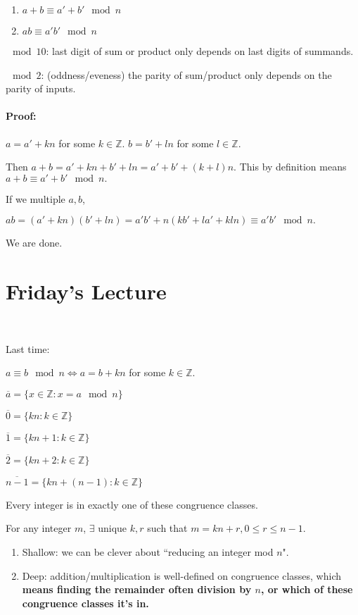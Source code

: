 \documentclass[a4paper, 11pt, twoside]{article}
\begin{document}
\begin{enumerate}
	\item $a+b\equiv a'+b' \mod n$
	\item $ab\equiv a'b' \mod n$
\end{enumerate}

$\mod 10$: last digit of sum or product only depends on last digits of summands.

$\mod 2$: (oddness/eveness) the parity of sum/product only depends on the parity of inputs.

\paragraph{Proof:} $a=a'+kn$ for some $k\in\mathbb{Z}$. $b=b'+ln$ for some $l\in\mathbb{Z}$.

Then $a+b=a'+kn+b'+ln=a'+b'+(k+l)n$. This by definition means $a+b\equiv a'+b' \mod n.$

If we multiple $a, b$,

$ab=(a'+kn)(b'+ln)=a'b'+n(kb'+la'+kln)\equiv a'b' \mod n.$

We are done.

\section{Friday's Lecture}\

Last time:

$a\equiv b\mod n\iff a=b+kn$ for some $k\in\mathbb{Z}$.

$\overline{a}=\{x\in\mathbb{Z}: x=a\mod n\}$

$\overline{0}=\{kn: k\in\mathbb{Z}\}$

$\overline{1}=\{kn+1: k\in\mathbb{Z}\}$

$\overline{2}=\{kn+2:k\in\mathbb{Z}\}$

$\overline{n-1} = \{kn+(n-1): k\in\mathbb{Z}\}$

Every integer is in exactly one of these congruence classes.

For any integer $m$, $\exists$ unique $k,r $ such that $m=kn+r, 0\leq r\leq n-1$.

\begin{enumerate}
	\item Shallow: we can be clever about ``reducing an integer mod $n$".
	\item Deep: addition/multiplication is well-defined on congruence  classes, which \textbf{means finding the remainder often division by $n$, or which of these congruence classes it's in.}
\end{enumerate}
\end{document}
